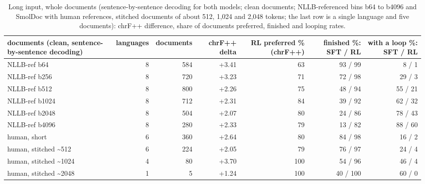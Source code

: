 \begin{table}[t]
\centering
\footnotesize
\setlength{\tabcolsep}{3pt}
\caption{Long input, whole documents (sentence-by-sentence decoding for both models; clean documents; NLLB-referenced bins b64 to b4096 and SmolDoc with human references, stitched documents of about 512, 1,024 and 2,048 tokens; the last row is a single language and five documents): chrF++ difference, share of documents preferred, finished and looping rates.}
\label{tab:t_pw_docs}
\begin{adjustbox}{max width=\linewidth}
{\def\LTcaptype{none} %
\begin{tabular}{@{}lrrrrrr@{}}
\toprule
documents (clean, sentence-by-sentence decoding) & languages & documents & chrF++ delta & RL preferred \% (chrF++) & finished \%: SFT / RL & with a loop \%: SFT / RL \\
\midrule
NLLB-ref b64 & 8 & 584 & +3.41 & 63 & 93 / 99 & 8 / 1 \\
NLLB-ref b256 & 8 & 720 & +3.23 & 71 & 72 / 98 & 29 / 3 \\
NLLB-ref b512 & 8 & 800 & +2.26 & 75 & 48 / 94 & 55 / 21 \\
NLLB-ref b1024 & 8 & 712 & +2.31 & 84 & 39 / 92 & 62 / 32 \\
NLLB-ref b2048 & 8 & 504 & +2.07 & 80 & 24 / 86 & 78 / 43 \\
NLLB-ref b4096 & 8 & 280 & +2.33 & 79 & 13 / 82 & 88 / 60 \\
human, short & 6 & 360 & +2.64 & 80 & 84 / 98 & 16 / 2 \\
human, stitched \textasciitilde512 & 6 & 224 & +2.05 & 79 & 76 / 97 & 24 / 4 \\
human, stitched \textasciitilde1024 & 4 & 80 & +3.70 & 100 & 54 / 96 & 46 / 4 \\
human, stitched \textasciitilde2048 & 1 & 5 & +1.24 & 100 & 40 / 100 & 60 / 0 \\
\bottomrule
\end{tabular}
}
\end{adjustbox}
\end{table}

